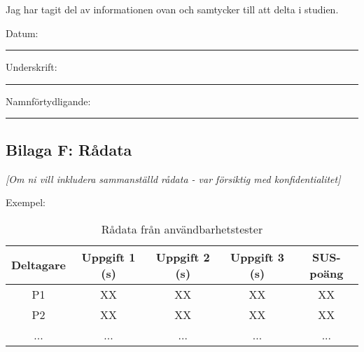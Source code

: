Jag har tagit del av informationen ovan och samtycker till att delta i studien.

Datum: \rule{3cm}{0.15mm}

Underskrift: \rule{5cm}{0.15mm}

Namnförtydligande: \rule{5cm}{0.15mm}


\subsection{Bilaga F: Rådata}

\textit{[Om ni vill inkludera sammanställd rådata - var försiktig med konfidentialitet]}

Exempel:
\begin{table}[h]
\centering
\small
\begin{tabular}{|c|c|c|c|c|}
\hline
\textbf{Deltagare} & \textbf{Uppgift 1 (s)} & \textbf{Uppgift 2 (s)} & \textbf{Uppgift 3 (s)} & \textbf{SUS-poäng} \\
\hline
P1 & XX & XX & XX & XX \\
P2 & XX & XX & XX & XX \\
... & ... & ... & ... & ... \\
\hline
\end{tabular}
\caption{Rådata från användbarhetstester}
\end{table}
